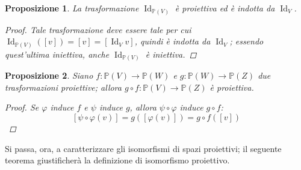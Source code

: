 \documentclass[12pt]{scrartcl}
\theoremstyle{style}
\newtheorem{prop}{Proposizione}[section]
\numberwithin{equation}{subsection}
\begin{document}
\begin{prop}
	La trasformazione $\operatorname{Id} _{\mathbb{P}(V)}$ \`e proiettiva ed \`e indotta da $\operatorname{Id} _V$.
	\begin{proof}
		Tale trasformazione deve essere tale per cui $\operatorname{Id} _{\mathbb{P}(V)} ([v]) = [v] = [\operatorname{Id} _V v]$, quindi \`e indotta da $\operatorname{Id} _V$; essendo quest'ultima iniettiva, anche $\operatorname{Id}_{\mathbb{P}(V)}  $ \`e iniettiva.
	\end{proof}
\end{prop}
\begin{prop}
	Siano $f : \mathbb{P}(V) \to \mathbb{P}(W)$ e $g:\mathbb{P}(W) \to \mathbb{P}(Z)$ due trasformazioni proiettive; allora $g\circ f:\mathbb{P}(V)\to \mathbb{P}(Z)$ \`e proiettiva.
	\begin{proof}
		Se $\varphi $ induce $f$ e $\psi $ induce $g$, allora $\psi \circ \varphi $ induce $g \circ f$:
		\[
		\left[ \psi \circ \varphi (v) \right] = g \left(\left[ \varphi (v) \right] \right) = g \circ f \left(\left[ v \right] \right) 
		\] 
	\end{proof}
\end{prop}
\noindent Si passa, ora, a caratterizzare gli isomorfismi di spazi proiettivi; il seguente teorema giustificher\`a la definizione di isomorfismo proiettivo.
\end{document}
